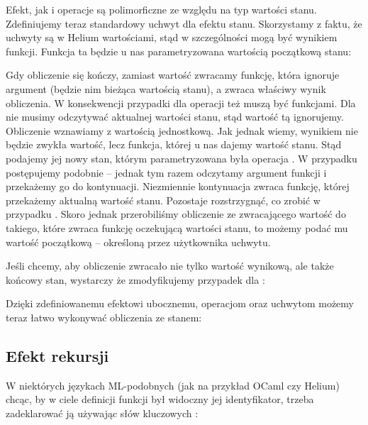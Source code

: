 

Efekt, jak i operacje są polimorficzne ze względu na typ wartości stanu. Zdefiniujemy teraz standardowy uchwyt dla efektu stanu. Skorzystamy z faktu, że uchwyty są w Helium wartościami, stąd w szczególności mogą być wynikiem funkcji. Funkcja ta będzie u nas parametryzowana wartością początkową stanu:



Gdy obliczenie się kończy, zamiast wartość zwracamy funkcję, która ignoruje argument (będzie nim bieżąca wartością stanu), a zwraca właściwy wynik obliczenia. W konsekwencji przypadki dla operacji też muszą być funkcjami. Dla  nie musimy odczytywać aktualnej wartości stanu, stąd wartość tą ignorujemy. Obliczenie wznawiamy z wartością jednostkową. Jak jednak wiemy, wynikiem nie będzie zwykła wartość, lecz funkcja, której u nas dajemy wartość stanu. Stąd podajemy jej nowy stan, którym parametryzowana była operacja . W przypadku  postępujemy podobnie -- jednak tym razem odczytamy argument funkcji i przekażemy go do kontynuacji. Niezmiennie kontynuacja zwraca funkcję, której przekażemy aktualną wartość stanu. Pozostaje rozstrzygnąć, co zrobić w przypadku . Skoro jednak przerobiliśmy obliczenie ze zwracającego wartość do takiego, które zwraca funkcję oczekującą wartości stanu, to możemy podać mu wartość początkową -- określoną przez użytkownika uchwytu.

Jeśli chcemy, aby obliczenie zwracało nie tylko wartość wynikową, ale także końcowy stan, wystarczy że zmodyfikujemy przypadek dla :



Dzięki zdefiniowanemu efektowi ubocznemu, operacjom oraz uchwytom możemy teraz łatwo wykonywać obliczenia ze stanem:


\pagebreak


\subsection{Efekt rekursji}

W niektórych językach ML-podobnych (jak na przykład OCaml czy Helium) chcąc, by w ciele definicji funkcji był widoczny jej identyfikator, trzeba zadeklarować ją używając słów kluczowych :

